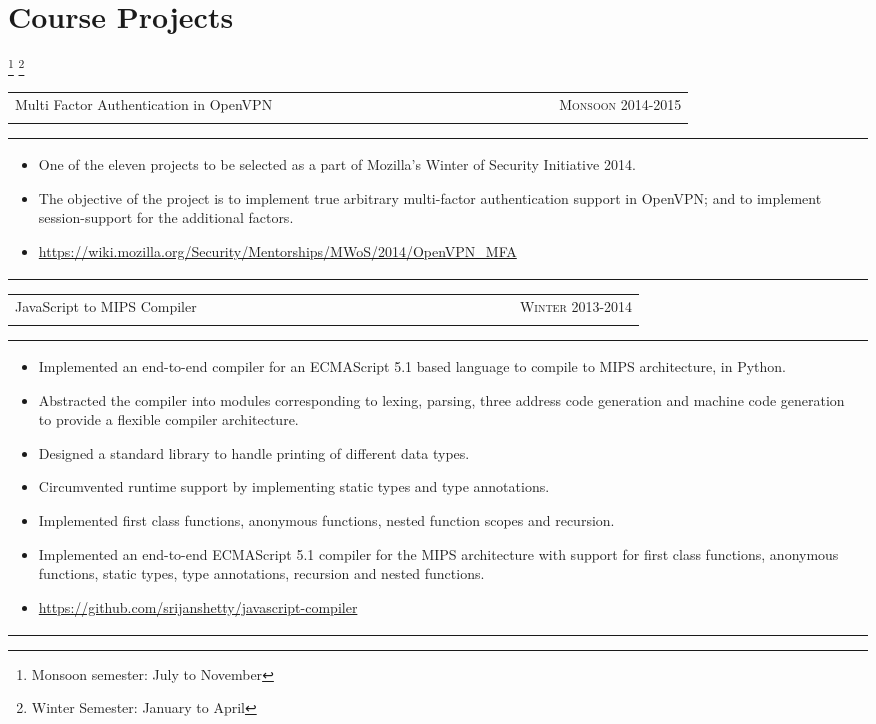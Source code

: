\documentclass[a4paper,10pt]{article} %
\newcommand{\lproject}[4]{
    \begin{tabular}{p{0.80\linewidth}r}
        \textcolor{NavyBlue}{#2} & \multicolumn{1}{m{4cm}}{\raggedleft \textsc{#1}}\\
        #3
    \end{tabular}
    \begin{tabular}{p{\linewidth}}
    \vspace{-0.3cm}
        \footnotesize{#4}
    \end{tabular}
    \vspace{-0.5cm}
}
\begin{document}
 \section{Course Projects}
 \let\thefootnote\relax\footnote{Monsoon semester: July to November}
 \let\thefootnote\relax\footnote{Winter Semester: January to April}

\lproject {Monsoon 2014-2015}
          {Multi Factor Authentication in OpenVPN}
          {\textsc{\raggedright Mozilla Winter of Security}, Guillaume Destuynder and Professor Dheeraj Sanghi}
          {
              \begin{itemize}[leftmargin=0.5cm]
                  \item One of the eleven projects to be selected as a part of Mozilla's Winter of Security Initiative 2014.
                  \item The objective of the project is to implement true arbitrary multi-factor authentication support in
                      OpenVPN; and to implement session-support for the additional factors.
                  \item \href{https://wiki.mozilla.org/Security/Mentorships/MWoS/2014/OpenVPN\_MFA}%
                      {https://wiki.mozilla.org/Security/Mentorships/MWoS/2014/OpenVPN\_MFA}
              \end{itemize}
          }

\lproject {Winter 2013-2014}
          {JavaScript to MIPS Compiler}
          {\textsc{\raggedright Compilers}, Professor Subhajit Roy}
          {
              \begin{itemize}[leftmargin=0.5cm]
                  \item Implemented an end-to-end compiler for an ECMAScript 5.1 based language to compile to MIPS
                      architecture, in Python.
                  \item Abstracted the compiler into modules corresponding to lexing, parsing, three address code generation
                      and machine code generation to provide a flexible compiler architecture.
                  \item Designed a standard library to handle printing of different data types.
                  \item Circumvented runtime support by implementing static types and type annotations.
                  \item Implemented first class functions, anonymous functions, nested function scopes and recursion.
                  \item Implemented an end-to-end ECMAScript 5.1 compiler for the MIPS architecture with support for first class
                      functions, anonymous functions, static types, type annotations, recursion and nested functions.
                  \item \href{https://github.com/srijanshetty/javascript-compiler} {https://github.com/srijanshetty/javascript-compiler}
              \end{itemize}
          }
\end{document}
